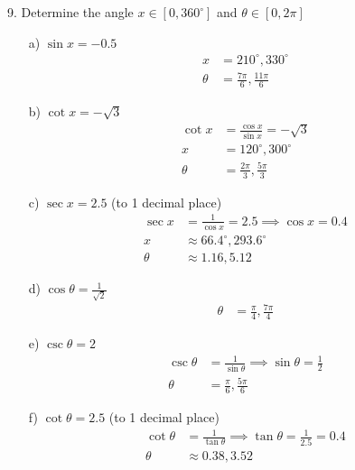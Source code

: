 \documentclass{article}
\newenvironment{solution}{\color{solutioncolor}}{}
\begin{document}
9. Determine the angle \( x \in [0, 360^{\circ}] \) and \( \theta \in [0, 2\pi] \)
\begin{enumerate}
    \item[a)] \( \sin x = -0.5 \)
    \begin{solution}
    \begin{align*}
        x &= 210^{\circ}, 330^{\circ} \\
        \theta &= \frac{7\pi}{6}, \frac{11\pi}{6}
    \end{align*}
    \end{solution}

    \item[b)] \( \cot x = -\sqrt{3} \)
    \begin{solution}
    \begin{align*}
        \cot x &= \frac{\cos x}{\sin x} = -\sqrt{3} \\
        x &= 120^{\circ}, 300^{\circ} \\
        \theta &= \frac{2\pi}{3}, \frac{5\pi}{3}
    \end{align*}
    \end{solution}
    \item[c)] \( \sec x = 2.5 \) (to 1 decimal place)
    \begin{solution}
    \begin{align*}
        \sec x &= \frac{1}{\cos x} = 2.5 \implies \cos x = 0.4 \\
        x &\approx 66.4^{\circ}, 293.6^{\circ} \\
        \theta &\approx 1.16, 5.12
    \end{align*}
    \end{solution}
    \item[d)] \( \cos \theta = \frac{1}{\sqrt{2}} \)
    \begin{solution}
    \begin{align*}
        \theta &= \frac{\pi}{4}, \frac{7\pi}{4}
    \end{align*}
    \end{solution}

    \item[e)] \( \csc \theta = 2 \)
    \begin{solution}
        \begin{align*}
        \csc \theta &= \frac{1}{\sin \theta} \implies \sin \theta = \frac{1}{2} \\
        \theta &= \frac{\pi}{6}, \frac{5\pi}{6}
    \end{align*}
    \end{solution}
    \item[f)] \( \cot \theta = 2.5 \) (to 1 decimal place)
\begin{solution}
    \begin{align*}
        \cot \theta &= \frac{1}{\tan \theta} \implies \tan \theta = \frac{1}{2.5} = 0.4 \\
        \theta &\approx 0.38, 3.52
    \end{align*}
    \end{solution}

\end{enumerate}
\end{document}
